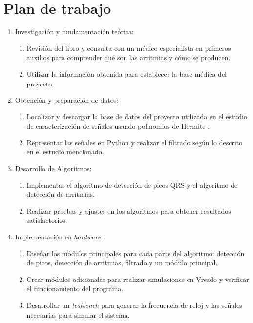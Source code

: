\section{Plan de trabajo}
\begin{enumerate}
	\item Investigación y fundamentación teórica:
	
	\begin{enumerate}
		\item Revisión del libro \cite{velez} y consulta con un médico especialista en primeros auxilios para comprender qué son las arritmias y cómo se producen.
	
		\item Utilizar la información obtenida para establecer la base médica del proyecto.
	\end{enumerate}

	\item Obtención y preparación de datos:
	\begin{enumerate}
		\item Localizar y descargar la base de datos del proyecto utilizada en el estudio de caracterización de señales usando polinomios de Hermite \cite{desai2021low}.

		\item Representar las señales en Python y realizar el filtrado según lo descrito en el estudio mencionado.
	\end{enumerate}
	\item Desarrollo de Algoritmos:
	\begin{enumerate}
		\item Implementar el algoritmo de detección de picos QRS y el algoritmo de detección de arritmias.

		\item Realizar pruebas y ajustes en los algoritmos para obtener resultados satisfactorios.
	\end{enumerate}
	
	\item Implementación en  \textit{hardware} : 
	\begin{enumerate}
		\item Diseñar los módulos principales para cada parte del algoritmo: detección de picos, detección de arritmias, filtrado y un módulo principal.

		\item Crear módulos adicionales para realizar simulaciones en Vivado y verificar el funcionamiento del programa.
		\item Desarrollar un \textit{testbench} para generar la frecuencia de reloj y las señales necesarias para simular el sistema.
	\end{enumerate}


\end{enumerate}
